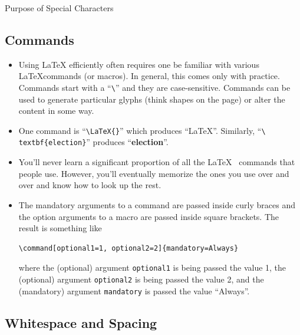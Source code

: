 \begin{itemize}
\begin{table}[h]
    \caption{Purpose of Special Characters}
  \end{table}

\end{itemize}

\subsection*{Commands}

\begin{itemize}

\item \par Using \LaTeX{} efficiently often requires one be familiar with
  various \LaTeX commands (or macros). In general, this comes only with
  practice. Commands start with a ``\texttt{\textbackslash}'' and they are
  case-sensitive. Commands can be used to generate particular glyphs (think
  shapes on the page) or alter the content in some way.

\item \par One command is ``\texttt{\textbackslash LaTeX\{\}}'' which
  produces ``\LaTeX''. Similarly, ``\texttt{\textbackslash
    textbf\{election\}}'' produces ``\textbf{election}''.

\item \par You'll never learn a significant proportion of all the \LaTeX~
  commands that people use. However, you'll eventually memorize the ones
  you use over and over and know how to look up the rest.

\item \par The mandatory arguments to a command are passed inside curly braces
  and the option arguments to a macro are passed inside square brackets. The
  result is something like
\begin{verbatim}
\command[optional1=1, optional2=2]{mandatory=Always}
\end{verbatim}
  where the (optional) argument \texttt{optional1} is being passed the value 1,
  the (optional) argument \texttt{optional2} is being passed the value 2, and
  the (mandatory) argument \texttt{mandatory} is passed the value ``Always''.
\end{itemize}

\subsection*{Whitespace and Spacing}

